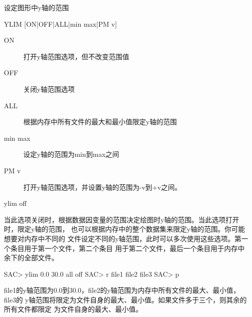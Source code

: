 \label{cmd:ylim}

设定图形中y轴的范围

\begin{SACSTX}
YLIM [ON|OFF|ALL|min max|PM v]
\end{SACSTX}

\begin{description}
\item [ON] 打开y轴范围选项，但不改变范围值 
\item [OFF] 关闭y轴范围选项
\item [ALL] 根据内存中所有文件的最大和最小值限定y轴的范围
\item [min max] 设定y轴的范围为min到max之间
\item [PM v] 打开y轴范围选项，并设置y轴的范围为-v到+v之间。
\end{description}

\begin{SACDFT}
ylim off
\end{SACDFT}

当此选项关闭时，根据数据因变量的范围决定绘图时y轴的范围。当此选项打开时，限定y轴的范围，
也可以根据内存中的整个数据集来限定y轴的范围。你可能想要对内存中不同的
文件设定不同的y轴范围，此时可以多次使用这些选项。第一个条目用于第一个文件，第二个条目
用于第二个文件，最后一个条目用于内存中余下的全部文件。

\begin{SACCode}
SAC> ylim 0.0 30.0 all off
SAC> r file1 file2 file3
SAC> p
\end{SACCode}
file1的y轴范围为0.0到30.0，file2的y轴范围为内存中所有文件的最大、最小值，file3的
y轴范围将限定为文件自身的最大、最小值。如果文件多于三个，则其余的所有文件都限定
为文件自身的最大、最小值。

